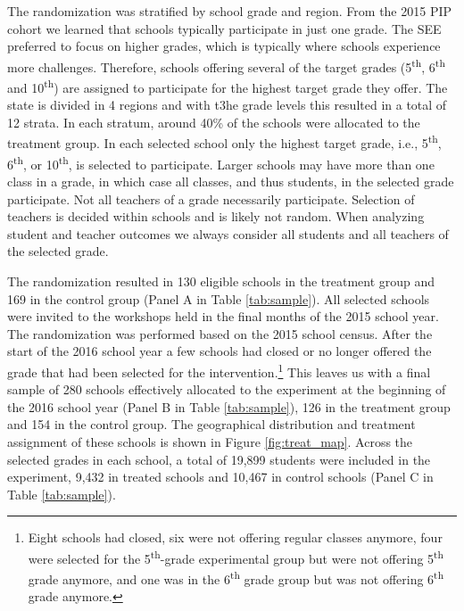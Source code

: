 \documentclass[11pt,a4paper]{article}
\begin{document}
	The randomization was stratified by school grade and region. From the 2015 PIP cohort we learned that schools typically participate in just one grade. The SEE preferred to focus on higher grades, which is typically where schools experience more challenges. Therefore, schools offering several of the target grades (5\textsuperscript{th}, 6\textsuperscript{th} and 10\textsuperscript{th}) are assigned to participate for the highest target grade they offer. The state is divided in 4 regions and with t3he  grade levels this resulted in a total of 12 strata. In each stratum, around 40\% of the schools were allocated to the treatment group. In each selected school only the highest target grade, i.e., 5\textsuperscript{th}, 6\textsuperscript{th}, or 10\textsuperscript{th}, is selected to participate. Larger schools may have more than one class in a grade, in which case all classes, and thus students, in the selected grade participate. Not all teachers of a grade necessarily participate. Selection of teachers is decided within schools and is likely not random. When analyzing student and teacher outcomes we always consider all students and all teachers of the selected grade. 
	
	The randomization resulted in 130 eligible schools in the treatment group and 169 in the control group (Panel A in Table \ref{tab:sample}). All selected schools were invited to the workshops held in the final months of the 2015 school year. The randomization was performed based on the 2015 school census. After the start of the 2016 school year a few schools had closed or no longer offered the grade that had been selected for the intervention.\footnote{Eight schools had closed, six were not offering regular classes anymore, four were selected for the 5\textsuperscript{th}-grade experimental group but were not offering 5\textsuperscript{th} grade anymore, and one was in the 6\textsuperscript{th} grade group but was not offering 6\textsuperscript{th} grade anymore.} This leaves us with a final sample of 280 schools effectively allocated to the experiment at the beginning of the 2016 school year (Panel B in Table \ref{tab:sample}), 126 in the treatment group and 154 in the control group. The geographical distribution and treatment assignment of these schools is shown in Figure \ref{fig:treat_map}. Across the selected grades in each school, a total of 19,899 students were included in the experiment, 9,432 in treated schools and 10,467 in control schools (Panel C in Table \ref{tab:sample}).  
	
	\vspace{15pt}
	
\end{document}

